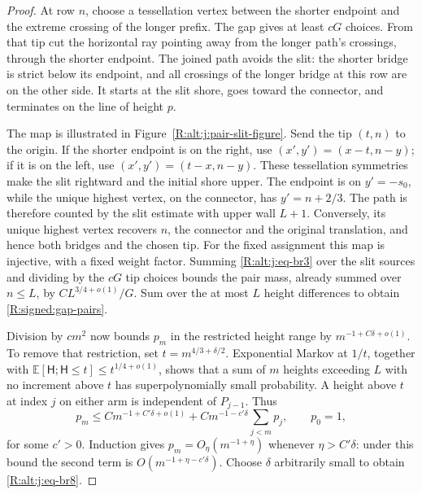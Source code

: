 \begin{proof}
At row $n$, choose a tessellation vertex between the shorter endpoint and
the extreme crossing of the longer prefix. The gap gives at least $cG$
choices. From that tip cut the horizontal ray pointing away from the
longer path's crossings, through the shorter endpoint. The joined path
avoids the slit: the shorter bridge is strict below its endpoint, and
all crossings of the longer bridge at this row are on the other side.
It starts at the slit shore, goes toward the connector, and terminates
on the line of height $p$.

The map is illustrated in Figure~\ref{R:alt:j:pair-slit-figure}.
Send the tip $(t,n)$ to the origin. If the shorter endpoint is on the
right, use $(x',y')=(x-t,n-y)$; if it is on the left, use
$(x',y')=(t-x,n-y)$. These tessellation symmetries make the slit rightward
and the initial shore upper. The endpoint is on $y'=-s_0$, while the
unique highest vertex, on the connector, has $y'=n+2/3$. The path is
therefore counted by the slit estimate with upper wall $L+1$. Conversely,
its unique highest vertex recovers $n$, the connector and the original
translation, and hence both bridges and the chosen tip. For the fixed
assignment this map is injective, with a fixed weight factor. Summing
\eqref{R:alt:j:eq-br3} over the slit sources and dividing by the $cG$
tip choices bounds the pair mass, already summed over $n\le L$, by
$CL^{3/4+o(1)}/G$. Sum over the at most $L$ height differences to obtain
\eqref{R:signed:gap-pairs}.

Division by $cm^2$ now bounds $p_m$ in the restricted height range by
$m^{-1+C\delta+o(1)}$. To remove that restriction, set
$t=m^{4/3+\delta/2}$. Exponential Markov at $1/t$, together with
$\mathbb E[\mathsf H;\mathsf H\le t]\le t^{1/4+o(1)}$, shows that a
sum of $m$ heights exceeding $L$ with no increment above $t$ has
superpolynomially small probability. A height above $t$ at index $j$
on either arm is independent of $P_{j-1}$. Thus
\[
 p_m\le Cm^{-1+C'\delta+o(1)}
       +Cm^{-1-c'\delta}\sum_{j<m}p_j,
 \qquad p_0=1,
\]
for some $c'>0$. Induction gives $p_m=O_\eta(m^{-1+\eta})$ whenever
$\eta>C'\delta$: under this bound the second term is
$O(m^{-1+\eta-c'\delta})$. Choose $\delta$ arbitrarily small to obtain
\eqref{R:alt:j:eq-br8}.
\end{proof}

